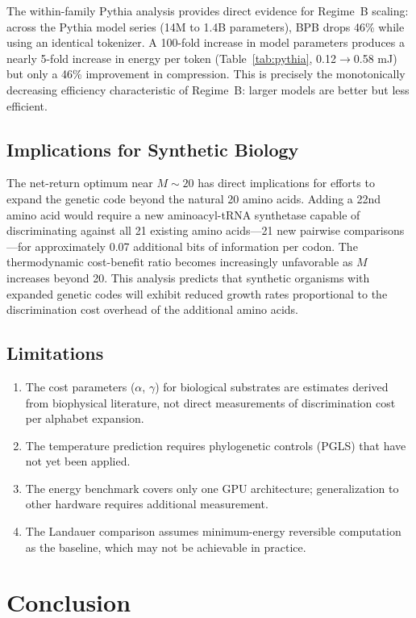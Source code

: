\documentclass[11pt]{article}
\begin{document}
The within-family Pythia analysis provides direct evidence for Regime~B scaling: across the Pythia model series (14M to 1.4B parameters), BPB drops 46\% while using an identical tokenizer. A 100-fold increase in model parameters produces a nearly 5-fold increase in energy per token (Table~\ref{tab:pythia}, 0.12$\to$0.58 mJ) but only a 46\% improvement in compression. This is precisely the monotonically decreasing efficiency characteristic of Regime~B: larger models are better but less efficient.

\subsection{Implications for Synthetic Biology}

The net-return optimum near $M \sim 20$ has direct implications for efforts to expand the genetic code beyond the natural 20 amino acids. Adding a 22nd amino acid would require a new aminoacyl-tRNA synthetase capable of discriminating against all 21 existing amino acids---21 new pairwise comparisons---for approximately 0.07 additional bits of information per codon. The thermodynamic cost-benefit ratio becomes increasingly unfavorable as $M$ increases beyond 20. This analysis predicts that synthetic organisms with expanded genetic codes will exhibit reduced growth rates proportional to the discrimination cost overhead of the additional amino acids.

\subsection{Limitations}

\begin{enumerate}
\item The cost parameters ($\alpha$, $\gamma$) for biological substrates are estimates derived from biophysical literature, not direct measurements of discrimination cost per alphabet expansion.
\item The temperature prediction requires phylogenetic controls (PGLS) that have not yet been applied.
\item The energy benchmark covers only one GPU architecture; generalization to other hardware requires additional measurement.
\item The Landauer comparison assumes minimum-energy reversible computation as the baseline, which may not be achievable in practice.
\end{enumerate}

\section{Conclusion}
\end{document}
